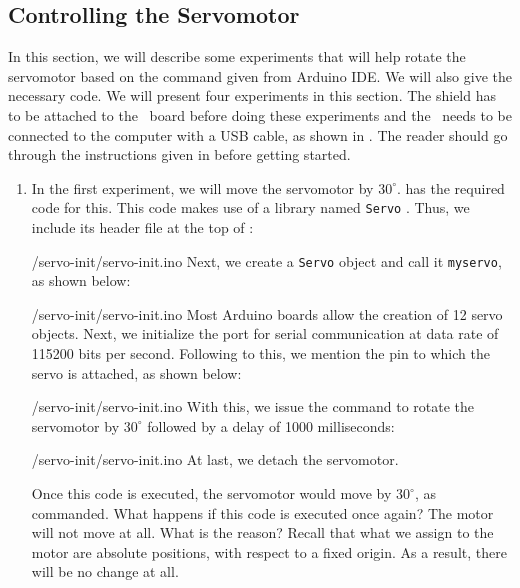 \subsection{Controlling the Servomotor}
\label{sec:servo-ard}
In this section, we will describe some experiments that will help
rotate the servomotor based on the command given from Arduino IDE.  We
will also give the necessary code.  We will present four experiments
in this section.  The shield has to be attached to the \arduino\ board
before doing these experiments and the \arduino\ needs to be connected to the computer 
with a USB cable, as shown in . The reader should go through the
instructions given in  before getting started.

\begin{enumerate}
  \item In the first experiment, we will move the servomotor by
        $30^\circ$.  has the required code for this.  
        This code makes use of a library named {\tt Servo} \cite{servo-lib}. 
        Thus, we include its header file at the top of :
        
        {\LocSERardcode/servo-init/servo-init.ino}
        Next, we create a {\tt Servo} object and call it {\tt myservo}, as shown below:
        
        {\LocSERardcode/servo-init/servo-init.ino}
        Most Arduino boards allow the creation of 12 servo objects. Next, we initialize the port for serial communication at
        data rate of 115200 bits per second. Following to this, we mention the 
        pin to which the servo is attached, as shown below:
        
        {\LocSERardcode/servo-init/servo-init.ino}
        With this, we issue the command to rotate the servomotor by $30^\circ$ followed by a delay of 
        1000 milliseconds:
        
        {\LocSERardcode/servo-init/servo-init.ino}
        At last, we  detach the servomotor.    
        
        Once this code is executed, the servomotor would move by
        $30^\circ$, as commanded.  What happens if this code is executed
        once again?  The motor will not move at all.  What is the reason?
        Recall that what we assign to the motor are absolute positions, with
        respect to a fixed origin.  As a result, there will be no change at
        all. 
        

\end{enumerate}
